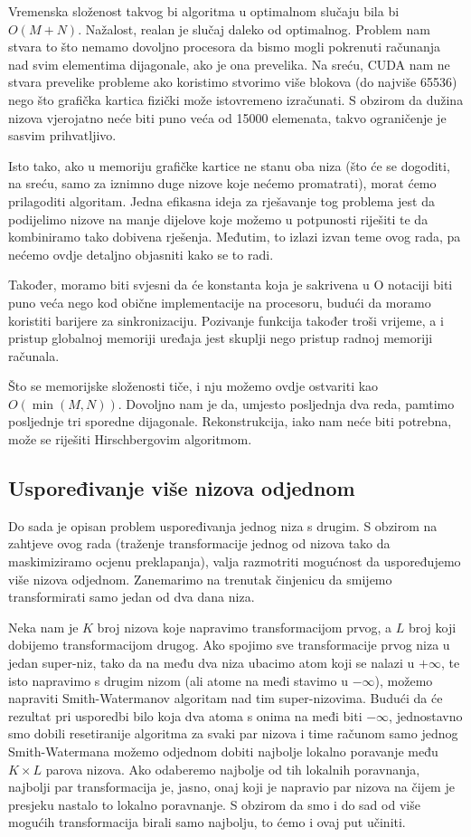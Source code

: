 \documentclass[times, utf8, zavrsni]{fer}
\begin{document}
Vremenska složenost takvog bi algoritma u optimalnom slučaju bila
bi $O(M+N)$. Nažalost, realan je slučaj daleko od optimalnog. 
Problem nam stvara to što nemamo dovoljno procesora da bismo
mogli pokrenuti računanja nad svim elementima dijagonale, ako je
ona prevelika. Na sreću, CUDA nam ne stvara prevelike probleme
ako koristimo stvorimo više blokova (do najviše 65536) nego što
grafička kartica fizički može istovremeno izračunati. S obzirom
da dužina nizova vjerojatno neće biti puno veća od 15000 elemenata, 
takvo ograničenje je sasvim prihvatljivo.

Isto tako, ako u memoriju grafičke kartice ne stanu
oba niza (što će se dogoditi, na sreću, samo za iznimno
duge nizove koje nećemo promatrati), morat ćemo prilagoditi
algoritam. Jedna efikasna ideja
za rješavanje tog problema jest da podijelimo nizove na manje
dijelove koje možemo u potpunosti riješiti te da kombiniramo
tako dobivena rješenja. 
Međutim, to izlazi izvan teme ovog rada, pa nećemo
ovdje detaljno objasniti kako se to radi.

Također, moramo biti svjesni da će konstanta koja je sakrivena u O
notaciji biti puno veća nego kod obične implementacije na procesoru,
budući da moramo koristiti barijere za sinkronizaciju. Pozivanje
funkcija također troši vrijeme, a i pristup globalnoj memoriji
uređaja jest skuplji nego pristup radnoj memoriji računala. 

Što se memorijske složenosti tiče, i nju možemo ovdje ostvariti
kao $O(\min(M,N))$. Dovoljno nam je da, umjesto posljednja dva reda,
pamtimo posljednje tri sporedne dijagonale. Rekonstrukcija, iako
nam neće biti potrebna, može se riješiti Hirschbergovim algoritmom. 

\subsection{Uspoređivanje više nizova odjednom}
Do sada je opisan problem uspoređivanja jednog niza s drugim. S obzirom
na zahtjeve ovog rada (traženje transformacije jednog od nizova tako
da maskimiziramo ocjenu preklapanja), valja razmotriti mogućnost da 
uspoređujemo više nizova odjednom. Zanemarimo na trenutak činjenicu
da smijemo transformirati samo jedan od dva dana niza. 

Neka nam je $K$ broj nizova koje napravimo transformacijom prvog, a
$L$ broj koji dobijemo transformacijom drugog. Ako spojimo sve
transformacije prvog niza u jedan super-niz, tako da na među 
dva niza ubacimo atom koji se nalazi u $+\infty$, te isto
napravimo s drugim nizom (ali atome na međi stavimo u $-\infty$),
možemo napraviti Smith-Watermanov algoritam nad tim super-nizovima.
Budući da će rezultat pri usporedbi bilo koja dva atoma s
onima na međi biti $-\infty$, jednostavno smo dobili resetiranije
algoritma za svaki par nizova i time računom samo jednog
Smith-Watermana možemo odjednom dobiti najbolje lokalno
poravanje među $K \times L$ parova nizova. Ako odaberemo najbolje
od tih lokalnih poravnanja, najbolji par transformacija je, jasno,
onaj koji je napravio par nizova na čijem je presjeku nastalo
to lokalno poravnanje.
S obzirom da smo i do sad od više mogućih transformacija birali samo
najbolju, to ćemo i ovaj put učiniti. 
\end{document}
